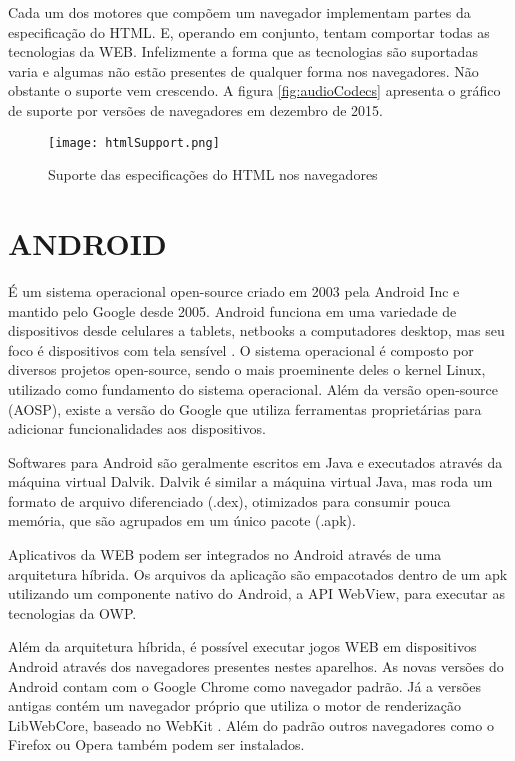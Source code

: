 Cada um dos motores que compõem um navegador implementam partes da
especificação do HTML. E, operando em conjunto, tentam comportar
todas as tecnologias da WEB. Infelizmente a forma que as tecnologias
são suportadas varia e algumas não estão presentes de qualquer
forma nos navegadores. Não obstante o suporte vem crescendo. A figura
\ref{fig:audioCodecs} apresenta o gráfico de suporte por versões de
navegadores em dezembro de 2015.

\begin{figure}[H]
    \centering
    \texttt{[image: htmlSupport.png]}
	\caption{Suporte das especificações do HTML nos navegadores}
    \label{fig:htmlSupport}
\end{figure}

\section{ANDROID}

É um sistema operacional open-source criado em 2003 pela Android
Inc e mantido pelo Google desde 2005. Android funciona em uma
variedade de dispositivos desde celulares a tablets, netbooks a
computadores desktop, mas seu foco é dispositivos com tela sensível
\autocite{chromeVsAndroid}. O sistema operacional é composto por
diversos projetos open-source, sendo o mais proeminente deles o kernel
Linux, utilizado como fundamento do sistema operacional. Além
da versão open-source (AOSP), existe a versão do Google que utiliza
ferramentas proprietárias  para adicionar funcionalidades aos dispositivos.

Softwares para Android são geralmente escritos em Java e executados
através da máquina virtual Dalvik. Dalvik é similar a máquina
virtual Java, mas roda um formato de arquivo diferenciado (.dex),
otimizados para consumir pouca memória, que são agrupados em um único
pacote (.apk). 

Aplicativos da WEB podem ser integrados no Android através de uma
arquitetura híbrida. Os arquivos da aplicação são empacotados dentro
de um apk utilizando um componente nativo do Android, a API WebView, para
executar as tecnologias da OWP.

Além da arquitetura híbrida, é possível executar jogos WEB em
dispositivos Android através dos navegadores presentes nestes
aparelhos. As novas versões do Android contam com o Google Chrome como navegador
padrão. Já a versões antigas contém um navegador próprio
que utiliza o motor de renderização LibWebCore, baseado no WebKit
\autocite{comparisonPlatforms}. Além do padrão outros navegadores como
o Firefox ou Opera também podem ser instalados.

